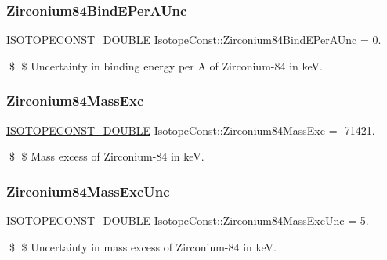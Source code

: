 \subsubsection{\texorpdfstring{Zirconium84\+Bind\+E\+Per\+A\+Unc}{Zirconium84BindEPerAUnc}}
{\footnotesize\ttfamily \mbox{\hyperlink{group___isotope_const-_macros_ga8f45a7272ce02c0b4c65c44636ed719a}{I\+S\+O\+T\+O\+P\+E\+C\+O\+N\+S\+T\+\_\+\+D\+O\+U\+B\+LE}} Isotope\+Const\+::\+Zirconium84\+Bind\+E\+Per\+A\+Unc = 0.}

\$ \$ Uncertainty in binding energy per A of Zirconium-\/84 in keV. \mbox{\label{group___isotope_const-_zirconium-_zr84_gad121e9c9a33db2aadc21e7c1a68889f4}} 
\subsubsection{\texorpdfstring{Zirconium84\+Mass\+Exc}{Zirconium84MassExc}}
{\footnotesize\ttfamily \mbox{\hyperlink{group___isotope_const-_macros_ga8f45a7272ce02c0b4c65c44636ed719a}{I\+S\+O\+T\+O\+P\+E\+C\+O\+N\+S\+T\+\_\+\+D\+O\+U\+B\+LE}} Isotope\+Const\+::\+Zirconium84\+Mass\+Exc = -\/71421.}

\$ \$ Mass excess of Zirconium-\/84 in keV. \mbox{\label{group___isotope_const-_zirconium-_zr84_gab92d05471481db1df0dd1ed2b8b0249b}} 
\subsubsection{\texorpdfstring{Zirconium84\+Mass\+Exc\+Unc}{Zirconium84MassExcUnc}}
{\footnotesize\ttfamily \mbox{\hyperlink{group___isotope_const-_macros_ga8f45a7272ce02c0b4c65c44636ed719a}{I\+S\+O\+T\+O\+P\+E\+C\+O\+N\+S\+T\+\_\+\+D\+O\+U\+B\+LE}} Isotope\+Const\+::\+Zirconium84\+Mass\+Exc\+Unc = 5.}

\$ \$ Uncertainty in mass excess of Zirconium-\/84 in keV. \mbox{\label{group___isotope_const-_zirconium-_zr84_ga840e094d611418eb0bc6ddde79ae5a88}} 
